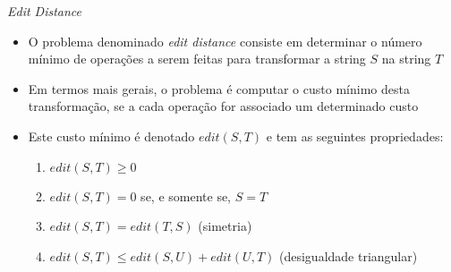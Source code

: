 \begin{frame}[fragile]{\it Edit Distance}

    \begin{itemize}
        \item O problema denominado \textit{edit distance} consiste em determinar o número mínimo 
            de operações a serem feitas para transformar a string $S$ na string $T$

        \item Em termos mais gerais, o problema é computar o custo mínimo desta transformação, se a cada operação for 
            associado um determinado custo

        \item Este custo mínimo é denotado $edit(S, T)$ e tem as seguintes propriedades:
        \begin{enumerate}
            \item $edit(S, T)\geq 0$
            \item $edit(S, T) = 0$ se, e somente se, $S = T$
            \item $edit(S, T) = edit(T, S)$ (simetria)
            \item $edit(S, T) \leq edit(S, U) + edit(U, T)$ (desigualdade triangular)
        \end{enumerate}
    \end{itemize}

\end{frame}


